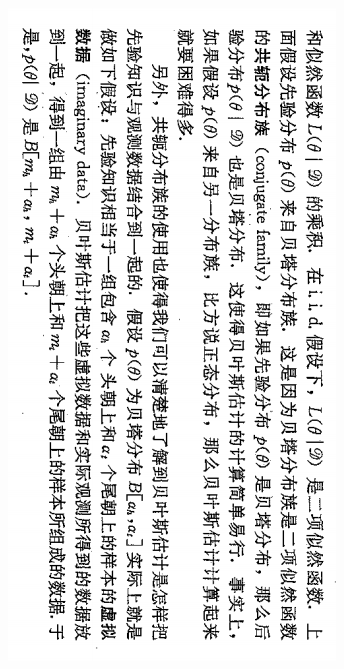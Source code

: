 \documentclass{article}
\begin{document}
\begin{figure}[h]
    \centering
    \includegraphics[width=1.05\columnwidth]{figs/conjugate_family2.png}
\end{figure}
\end{document}
